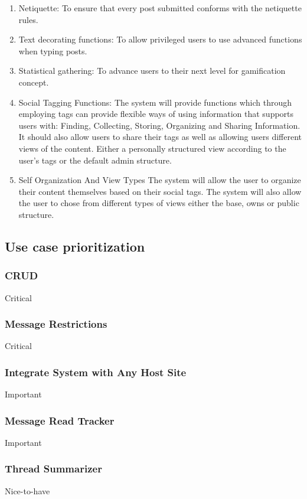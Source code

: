 \documentclass[hidelinks, 12pt, oneside]{article}
\begin{document}
\begin{enumerate}
\item{Netiquette}: To ensure that every post submitted conforms with the netiquette rules.

\item{Text decorating functions}: To allow privileged users to use advanced functions when typing posts.

\item{Statistical gathering}: To advance users to their next level for gamification concept.

\item{Social Tagging Functions}: The system will provide functions which through employing tags can provide flexible ways of using information that supports users with: Finding, Collecting, Storing, Organizing and Sharing Information. It should also allow users to share their tags as well as allowing users different views of the content. Either a personally structured view according to the user's tags or the default admin structure.

\item{Self Organization And View Types} The system will allow the user to organize their content themselves based on their social tags. The system will also allow the user to chose from different types of views either the base, owns or public structure.
 
\end{enumerate}

\subsection{Use case prioritization}
\subsubsection{CRUD}
Critical
\subsubsection{Message Restrictions}
Critical
\subsubsection{Integrate System with Any Host Site}
Important
\subsubsection{Message Read Tracker}
Important
\subsubsection{Thread Summarizer}
Nice-to-have
\end{document}
